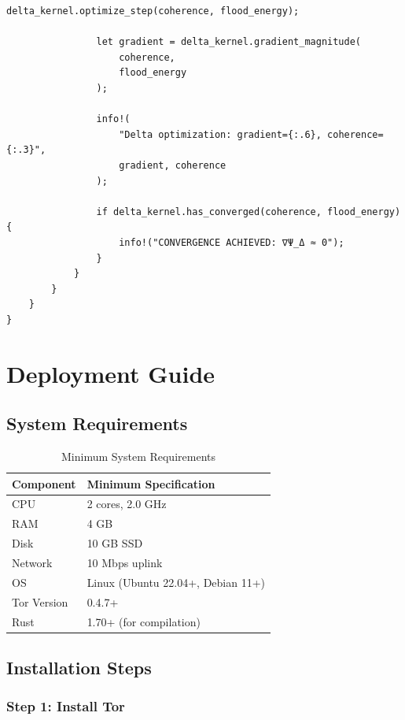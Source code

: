\documentclass[11pt,a4paper]{article}
\begin{document}
\begin{lstlisting}[style=rust]
                delta_kernel.optimize_step(coherence, flood_energy);
                
                let gradient = delta_kernel.gradient_magnitude(
                    coherence, 
                    flood_energy
                );
                
                info!(
                    "Delta optimization: gradient={:.6}, coherence={:.3}",
                    gradient, coherence
                );
                
                if delta_kernel.has_converged(coherence, flood_energy) {
                    info!("CONVERGENCE ACHIEVED: ∇Ψ_Δ ≈ 0");
                }
            }
        }
    }
}
\end{lstlisting}

\newpage
\section{Deployment Guide}

\subsection{System Requirements}

\begin{table}[h]
\centering
\begin{tabular}{@{}ll@{}}
\toprule
\textbf{Component} & \textbf{Minimum Specification} \\ \midrule
CPU & 2 cores, 2.0 GHz \\
RAM & 4 GB \\
Disk & 10 GB SSD \\
Network & 10 Mbps uplink \\
OS & Linux (Ubuntu 22.04+, Debian 11+) \\
Tor Version & 0.4.7+ \\
Rust & 1.70+ (for compilation) \\
\bottomrule
\end{tabular}
\caption{Minimum System Requirements}
\end{table}

\subsection{Installation Steps}

\subsubsection{Step 1: Install Tor}
\end{document}
